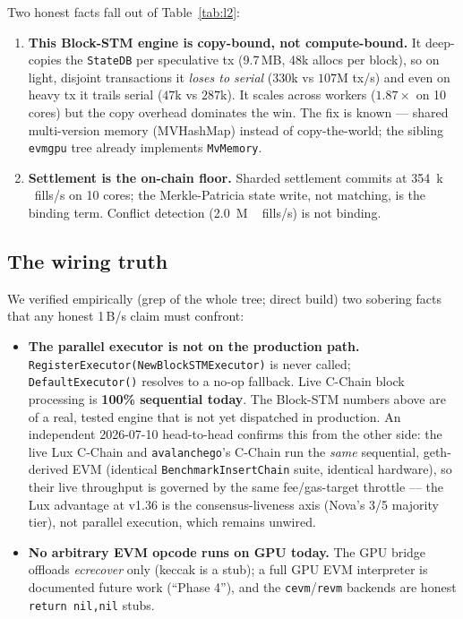\documentclass[11pt,a4paper]{article}
\begin{document}
Two honest facts fall out of Table~\ref{tab:l2}:
\begin{enumerate}[leftmargin=2em,itemsep=1pt]
  \item \textbf{This Block-STM engine is copy-bound, not
        compute-bound.} It deep-copies the \texttt{StateDB} per
        speculative tx (9.7\,MB, 48k allocs per block), so on light,
        disjoint transactions it \emph{loses to serial}
        ($330$k vs $107$M tx/s) and even on heavy tx it trails serial
        ($47$k vs $287$k). It scales across workers ($1.87\times$ on 10
        cores) but the copy overhead dominates the win. The fix is
        known --- shared multi-version memory (MVHashMap) instead of
        copy-the-world; the sibling \texttt{evmgpu} tree already
        implements \texttt{MvMemory}.
  \item \textbf{Settlement is the on-chain floor.} Sharded settlement
        commits at \SI{354}{k\,fills/s} on 10 cores; the Merkle-Patricia
        state write, not matching, is the binding term. Conflict
        detection (\SI{2.0}{M\,fills/s}) is not binding.
\end{enumerate}

\subsection{The wiring truth}\label{sec:l2wiring}

We verified empirically (grep of the whole tree; direct build) two
sobering facts that any honest 1\,B/s claim must confront:
\begin{itemize}[leftmargin=2em,itemsep=1pt]
  \item \textbf{The parallel executor is not on the production path.}
        \texttt{RegisterExecutor(NewBlockSTMExecutor)} is never called;
        \texttt{DefaultExecutor()} resolves to a no-op fallback. Live
        C-Chain block processing is \textbf{100\% sequential today}. The
        Block-STM numbers above are of a real, tested engine that is not
        yet dispatched in production. An independent 2026-07-10 head-to-head
        \cite{benchvsava} confirms this from the other side: the live Lux
        C-Chain and \texttt{avalanchego}'s C-Chain run the \emph{same}
        sequential, geth-derived EVM (identical \texttt{BenchmarkInsertChain}
        suite, identical hardware), so their live throughput is governed by the
        same fee/gas-target throttle --- the Lux advantage at v1.36 is the
        consensus-liveness axis (Nova's 3/5 majority tier), not parallel
        execution, which remains unwired.
  \item \textbf{No arbitrary EVM opcode runs on GPU today.} The GPU
        bridge offloads \emph{ecrecover} only (keccak is a stub); a full
        GPU EVM interpreter is documented future work (``Phase 4''), and
        the \texttt{cevm}/\texttt{revm} backends are honest
        \texttt{return nil,nil} stubs.
\end{itemize}
\end{document}
